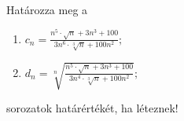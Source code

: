 \documentclass[11pt]{scrartcl}
\begin{document}
Határozza meg a
\begin{enumerate}
	\item \(\displaystyle
	      c_n = \frac{
		      n^5 \cdot \sqrt{n} + 3n^3 + 100
	      }{
		      3n^6 \cdot \sqrt[3]{n} + 100n^2
	      };
	      \)

	\item \(\displaystyle
	      d_n = \sqrt[n]{\frac{
				      n^5 \cdot \sqrt{n} + 3n^3 + 100
			      }{
				      3n^4 \cdot \sqrt[3]{n} + 100n^2
			      }};
	      \)
\end{enumerate}
sorozatok határértékét, ha léteznek!
\end{document}
